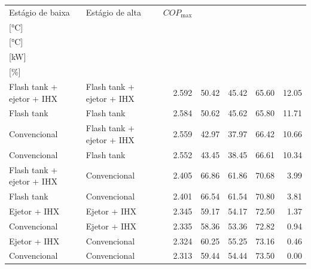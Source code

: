 {\small\setlength{\tabcolsep}{4pt}\renewcommand{\arraystretch}{1.12}
\begin{tabular}{llrrrrr}
\toprule
Estágio de baixa & Estágio de alta & $COP_{\max}$ & \shortstack{$T_{\mathrm{cond,l}}^*$\\{[°C]}} & \shortstack{$T_{\mathrm{evap,h}}^*$\\{[°C]}} & \shortstack{$\dot W_{\mathrm{liq}}$\\{[kW]}} & \shortstack{$\Delta COP_{\mathrm{opt}}$\\{[\%]}} \\
\midrule
Flash tank + ejetor + IHX & Flash tank + ejetor + IHX & 2.592 & 50.42 & 45.42 & 65.60 & 12.05 \\
Flash tank & Flash tank & 2.584 & 50.62 & 45.62 & 65.80 & 11.71 \\
Convencional & Flash tank + ejetor + IHX & 2.559 & 42.97 & 37.97 & 66.42 & 10.66 \\
Convencional & Flash tank & 2.552 & 43.45 & 38.45 & 66.61 & 10.34 \\
Flash tank + ejetor + IHX & Convencional & 2.405 & 66.86 & 61.86 & 70.68 & 3.99 \\
Flash tank & Convencional & 2.401 & 66.54 & 61.54 & 70.80 & 3.81 \\
Ejetor + IHX & Ejetor + IHX & 2.345 & 59.17 & 54.17 & 72.50 & 1.37 \\
Convencional & Ejetor + IHX & 2.335 & 58.36 & 53.36 & 72.82 & 0.94 \\
Ejetor + IHX & Convencional & 2.324 & 60.25 & 55.25 & 73.16 & 0.46 \\
Convencional & Convencional & 2.313 & 59.44 & 54.44 & 73.50 & 0.00 \\
\bottomrule
\end{tabular}
}
